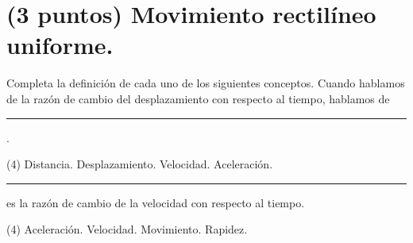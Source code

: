 \documentclass[12pt, letter]{exam}
\begin{document}
\begin{questions}
\begin{tasks}
    \end{tasks}

    \section{(3 puntos) Movimiento rectilíneo uniforme.}

    Completa la definición de cada uno de los siguientes conceptos.
    \question Cuando hablamos de la razón de cambio del desplazamiento con respecto al tiempo, hablamos de  \rule{2cm}{0.1mm}.
    \begin{tasks}(4)
        \task Distancia.
        \task Desplazamiento.
        \task Velocidad.
        \task Aceleración.
    \end{tasks}
    \question \rule{1.5cm}{0.1mm} es la razón de cambio de la velocidad con respecto al tiempo.
    \begin{tasks}(4)
        \task Aceleración.
        \task Velocidad.
        \task Movimiento.
        \task Rapidez.
    \end{tasks}


\end{questions}
\end{document}
